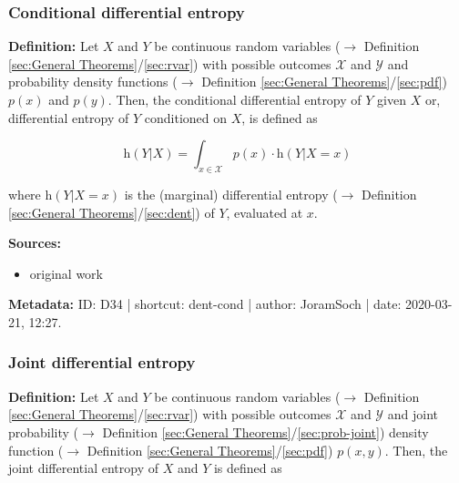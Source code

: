 \documentclass[a4paper,12pt,twoside]{book}
\begin{document}
\subsubsection[\textit{Conditional differential entropy}]{Conditional differential entropy} \label{sec:dent-cond}
\setcounter{equation}{0}

\textbf{Definition:} Let $X$ and $Y$ be continuous random variables ($\rightarrow$ Definition \ref{sec:General Theorems}/\ref{sec:rvar}) with possible outcomes $\mathcal{X}$ and $\mathcal{Y}$ and probability density functions ($\rightarrow$ Definition \ref{sec:General Theorems}/\ref{sec:pdf}) $p(x)$ and $p(y)$. Then, the conditional differential entropy of $Y$ given $X$ or, differential entropy of $Y$ conditioned on $X$, is defined as

\begin{equation} \label{eq:dent-cond-dent-cond}
\mathrm{h}(Y|X) = \int_{x \in \mathcal{X}} p(x) \cdot \mathrm{h}(Y|X=x)
\end{equation}

where $\mathrm{h}(Y \vert X=x)$ is the (marginal) differential entropy ($\rightarrow$ Definition \ref{sec:General Theorems}/\ref{sec:dent}) of $Y$, evaluated at $x$.


\vspace{1em}
\textbf{Sources:}
\begin{itemize}
\item original work\end{itemize}


\vspace{1em}
\textbf{Metadata:} ID: D34 | shortcut: dent-cond | author: JoramSoch | date: 2020-03-21, 12:27.
\vspace{1em}



\subsubsection[\textit{Joint differential entropy}]{Joint differential entropy} \label{sec:dent-joint}
\setcounter{equation}{0}

\textbf{Definition:} Let $X$ and $Y$ be continuous random variables ($\rightarrow$ Definition \ref{sec:General Theorems}/\ref{sec:rvar}) with possible outcomes $\mathcal{X}$ and $\mathcal{Y}$ and joint probability ($\rightarrow$ Definition \ref{sec:General Theorems}/\ref{sec:prob-joint}) density function ($\rightarrow$ Definition \ref{sec:General Theorems}/\ref{sec:pdf}) $p(x,y)$. Then, the joint differential entropy of $X$ and $Y$ is defined as
\end{document}
